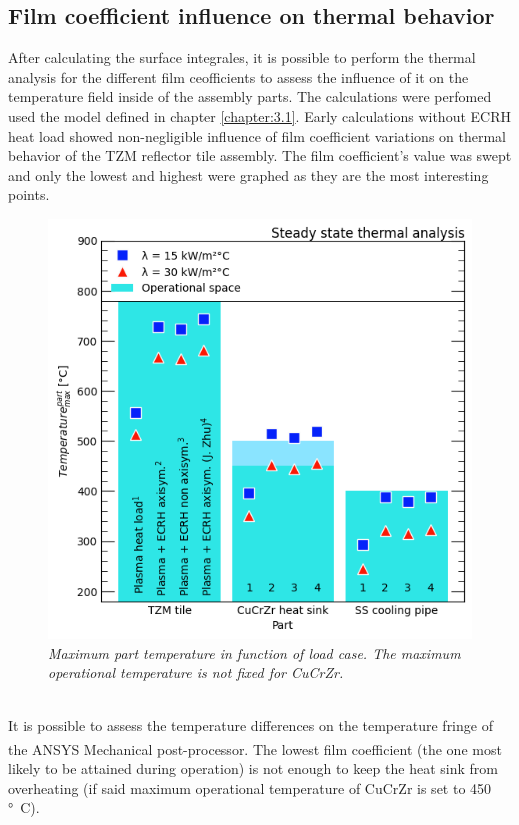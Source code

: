 \subsection{Film coefficient influence on thermal behavior}
\normalsize{After calculating the surface integrales, it is possible to perform the thermal analysis for the different film ceofficients to assess the influence of it on the temperature field inside of the assembly parts. The calculations were perfomed used the model defined in chapter \ref{chapter:3.1}. Early calculations without \acrshort{ECRH} heat load showed non-negligible influence of film coefficient variations on thermal behavior of the \acrshort{TZM} reflector tile assembly. The film coefficient's value was swept and only the lowest and highest were graphed as they are the most interesting points.}
\\
\begin{figure}[h!]
    \label{fig_5_7} 
    \centering
    \includegraphics[width=.9\textwidth]{figures/filmcoefficient15and30.png}
    \caption{\it Maximum part temperature in function of load case. The maximum operational temperature is not fixed for \acrshort{CuCrZr}.}
\end{figure}
\\
\normalsize{\indent It is possible to assess the temperature differences on the temperature fringe of the ANSYS\textsuperscript{\textregistered} Mechanical post-processor. The lowest film coefficient (the one most likely to be attained during operation) is not enough to keep the heat sink from overheating (if said maximum operational temperature of \acrshort{CuCrZr} is set to 450 \unit{\si{\degree}C}).}
